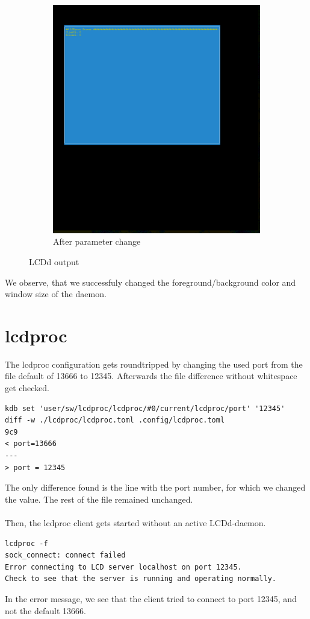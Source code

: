 \documentclass[12pt]{report}
\begin{document}
\begin{figure}[h!]
\begin{subfigure}[b]{0.4\linewidth}
		\includegraphics[width=\linewidth]{lcdd_changed.png}
		\caption{After parameter change}
	\end{subfigure}
  \caption{LCDd output}
\label{fig:lcdd}
\end{figure}
\FloatBarrier
We observe, that we successfuly changed the foreground/background color and window size of the daemon.

\section{lcdproc}
The lcdproc configuration gets roundtripped by changing the used port from the file default of 13666 to 12345.
Afterwards the file difference without whitespace get checked.
{\small
\begin{verbatim}
kdb set 'user/sw/lcdproc/lcdproc/#0/current/lcdproc/port' '12345'
diff -w ./lcdproc/lcdproc.toml .config/lcdproc.toml
9c9
< port=13666
---
> port = 12345
\end{verbatim}
}
The only difference found is the line with the port number, for which we changed the value.
The rest of the file remained unchanged.
\\\\
Then, the lcdproc client gets started without an active LCDd-daemon.
{\small
\begin{verbatim}
lcdproc -f
sock_connect: connect failed
Error connecting to LCD server localhost on port 12345.
Check to see that the server is running and operating normally.
\end{verbatim}
}
In the error message, we see that the client tried to connect to port 12345, and not the default 13666.
\end{document}
